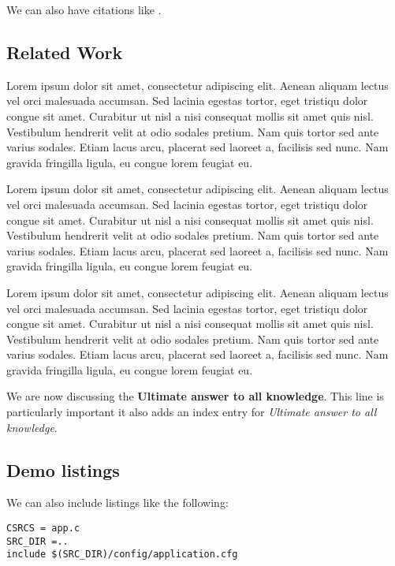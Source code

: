 We can also have citations like \cite{iso-odf}.

\subsection{Related Work}

Lorem ipsum dolor sit amet, consectetur adipiscing elit. Aenean aliquam lectus vel orci malesuada accumsan. Sed lacinia egestas tortor, eget tristiqu dolor congue sit amet. Curabitur ut nisl a nisi consequat mollis sit amet quis nisl. Vestibulum hendrerit velit at odio sodales pretium. Nam quis tortor sed ante varius sodales. Etiam lacus arcu, placerat sed laoreet a, facilisis sed nunc. Nam gravida fringilla ligula, eu congue lorem feugiat eu.


Lorem ipsum dolor sit amet, consectetur adipiscing elit. Aenean aliquam lectus vel orci malesuada accumsan. Sed lacinia egestas tortor, eget tristiqu dolor congue sit amet. Curabitur ut nisl a nisi consequat mollis sit amet quis nisl. Vestibulum hendrerit velit at odio sodales pretium. Nam quis tortor sed ante varius sodales. Etiam lacus arcu, placerat sed laoreet a, facilisis sed nunc. Nam gravida fringilla ligula, eu congue lorem feugiat eu.


Lorem ipsum dolor sit amet, consectetur adipiscing elit. Aenean aliquam lectus vel orci malesuada accumsan. Sed lacinia egestas tortor, eget tristiqu dolor congue sit amet. Curabitur ut nisl a nisi consequat mollis sit amet quis nisl. Vestibulum hendrerit velit at odio sodales pretium. Nam quis tortor sed ante varius sodales. Etiam lacus arcu, placerat sed laoreet a, facilisis sed nunc. Nam gravida fringilla ligula, eu congue lorem feugiat eu.

We are now discussing the \textbf{Ultimate answer to all knowledge}.
This line is particularly important it also adds an index entry for \textit{Ultimate answer to all knowledge}.

\subsection{Demo listings}

We can also include listings like the following:

\lstset{language=make,caption=Application Makefile,label=lst:app-make}
\begin{lstlisting}
CSRCS = app.c
SRC_DIR =..
include $(SRC_DIR)/config/application.cfg
\end{lstlisting}

